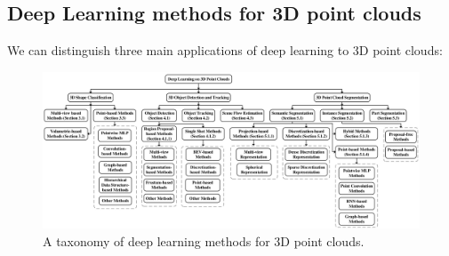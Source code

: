 \documentclass[11pt,a4paper]{article}
\begin{document}
\subsection{Deep Learning methods for 3D point clouds}
We can distinguish three main applications of deep learning to 3D point clouds:
\begin{figure}[H]
    \centering
    \includegraphics[scale=0.7]{imgs/pointcloud-deeplearning-taxonomy.jpg}
    \caption{A taxonomy of deep learning methods for 3D point clouds. \cite{abs200106280}}
\end{figure}
\noindent
\end{document}
